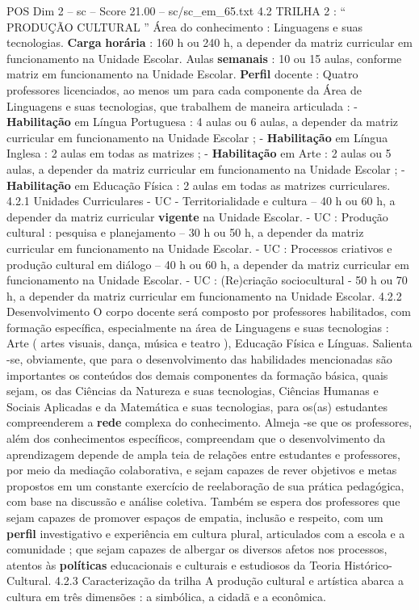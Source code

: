\begin{textsample}{POS Dim 2 – sc – Score 21.00 – sc/sc\_em\_65.txt}  \label{ex:f2_pos_013}
4.2 TRILHA 2 : “ PRODUÇÃO CULTURAL ” Área do conhecimento : Linguagens e suas tecnologias. \textbf{Carga} \textbf{horária} : 160 h ou 240 h, a depender da matriz curricular em funcionamento na Unidade Escolar.
Aulas \textbf{semanais} : 10 ou 15 aulas, conforme matriz em funcionamento na Unidade Escolar. \textbf{Perfil} docente : Quatro professores licenciados, ao menos um para cada componente da Área de Linguagens e suas tecnologias, que trabalhem de maneira articulada : - \textbf{Habilitação} em Língua Portuguesa : 4 aulas ou 6 aulas, a depender da matriz curricular em funcionamento na Unidade Escolar ; - \textbf{Habilitação} em Língua Inglesa : 2 aulas em todas as matrizes ; - \textbf{Habilitação} em Arte : 2 aulas ou 5 aulas, a depender da matriz curricular em funcionamento na Unidade Escolar ; - \textbf{Habilitação} em Educação Física : 2 aulas em todas as matrizes curriculares. 4.2.1 Unidades Curriculares - UC - Territorialidade e cultura – 40 h ou 60 h, a depender da matriz curricular \textbf{vigente} na Unidade Escolar. - UC : Produção cultural : pesquisa e planejamento – 30 h ou 50 h, a depender da matriz curricular em funcionamento na Unidade Escolar. - UC : Processos criativos e produção cultural em diálogo – 40 h ou 60 h, a depender da matriz curricular em funcionamento na Unidade Escolar. - UC : (Re)criação sociocultural - 50 h ou 70 h, a depender da matriz curricular em funcionamento na Unidade Escolar. 4.2.2 Desenvolvimento O corpo docente será composto por professores habilitados, com formação específica, especialmente na área de Linguagens e suas tecnologias : Arte ( artes visuais, dança, música e teatro ), Educação Física e Línguas.
Salienta -se, obviamente, que para o desenvolvimento das habilidades mencionadas são importantes os conteúdos dos demais componentes da formação básica, quais sejam, os das Ciências da Natureza e suas tecnologias, Ciências Humanas e Sociais Aplicadas e da Matemática e suas tecnologias, para os(as) estudantes compreenderem a \textbf{rede} complexa do conhecimento.
Almeja -se que os professores, além dos conhecimentos específicos, compreendam que o desenvolvimento da aprendizagem depende de ampla teia de relações entre estudantes e professores, por meio da mediação colaborativa, e sejam capazes de rever objetivos e metas propostos em um constante exercício de reelaboração de sua prática pedagógica, com base na discussão e análise coletiva.
Também se espera dos professores que sejam capazes de promover espaços de empatia, inclusão e respeito, com um \textbf{perfil} investigativo e experiência em cultura plural, articulados com a escola e a comunidade ; que sejam capazes de albergar os diversos afetos nos processos, atentos às \textbf{políticas} educacionais e culturais e estudiosos da Teoria Histórico-Cultural. 4.2.3 Caracterização da trilha A produção cultural e artística abarca a cultura em três dimensões : a simbólica, a cidadã e a econômica.

\end{textsample}
